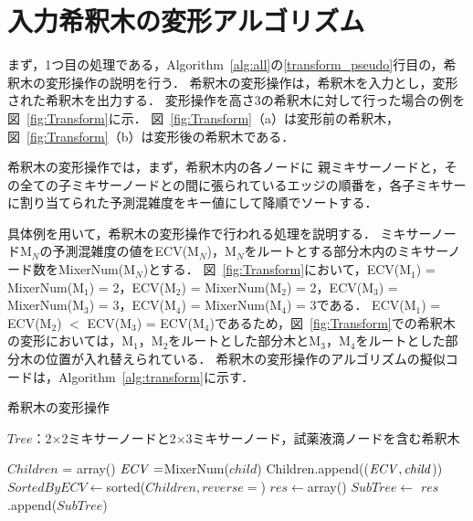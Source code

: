 \section{入力希釈木の変形アルゴリズム}
まず，1つ目の処理である，Algorithm~\ref{alg:all}の\ref{transform_pseudo}行目の，希釈木の変形操作の説明を行う． 希釈木の変形操作は，希釈木を入力とし，変形された希釈木を出力する． 変形操作を高さ3の希釈木に対して行った場合の例を図~\ref{fig:Transform}に示．
図~\ref{fig:Transform}（a）は変形前の希釈木，図~\ref{fig:Transform}（b）は変形後の希釈木である．

希釈木の変形操作では，まず，希釈木内の各ノードに
親ミキサーノードと，その全ての子ミキサーノードとの間に張られているエッジの順番を，各子ミキサーに割り当てられた予測混雑度をキー値にして降順でソートする． 

具体例を用いて，希釈木の変形操作で行われる処理を説明する．
ミキサーノードM$_N$の予測混雑度の値をECV(M$_N$)，M$_N$をルートとする部分木内のミキサーノード数をMixerNum(M$\mathit{_N}$)とする．
図~\ref{fig:Transform}において，ECV(M$_1$) = MixerNum(M$_1$) = 2，ECV(M$_2$) = MixerNum(M$_2$) = 2，ECV(M$_3$) = MixerNum(M$_3$) = 3，ECV(M$_4$) = MixerNum(M$_4$) = 3である．
ECV(M$_1$) = ECV(M$_2$) $<$ ECV(M$_3$) = ECV(M$_4$)であるため，図~\ref{fig:Transform}での希釈木の変形においては，M$_1$，M$_2$をルートとした部分木とM$_3$，M$_4$をルートとした部分木の位置が入れ替えられている．
希釈木の変形操作のアルゴリズムの擬似コードは，Algorithm~\ref{alg:transform}に示す．


\begin{algorithm}[tbp]
 \caption{希釈木の変形操作}\label{alg:transform}
 \begin{algorithmic}[1]
     \Require $\mathit{Tree}$：2$\times$2ミキサーノードと2$\times$3ミキサーノード，試薬液滴ノードを含む希釈木 

        \State $\mathit{Children}$ = array()
            \State $\mathit{ECV}=$MixerNum($child$) 
            \State Children.append(($\mathit{ECV,child}$))
        \EndFor 
        \State $\mathit{SortedByECV} \gets $sorted($Children,reverse=$\True)
        \State $\mathit{res}\gets$array()
            \State $\mathit{SubTree}\gets $
            \State $\mathit{res}$.append($\mathit{SubTree}$)
        \EndFor 
        \State {}
        \State {}
        
        \Return {}
    \EndFunction 

 \end{algorithmic}
\end{algorithm}

